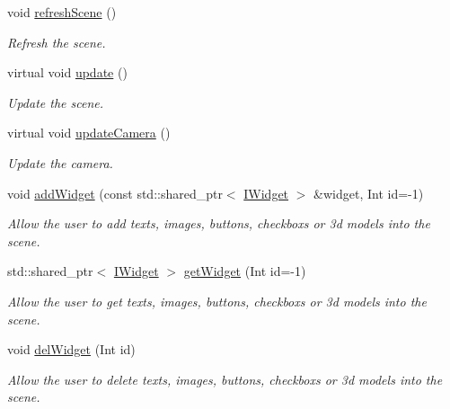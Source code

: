 \begin{DoxyCompactItemize}
\mbox{\label{classAScene_a94eb6d219e423c298a4c8339df47671c}} 
void \hyperlink{classAScene_a94eb6d219e423c298a4c8339df47671c}{refresh\+Scene} ()
\begin{DoxyCompactList}\small\item\em Refresh the scene. \end{DoxyCompactList}\item 
\mbox{\label{classAScene_a5f13212b503601ef58b8387b36c5796c}} 
virtual void \hyperlink{classAScene_a5f13212b503601ef58b8387b36c5796c}{update} ()
\begin{DoxyCompactList}\small\item\em Update the scene. \end{DoxyCompactList}\item 
\mbox{\label{classAScene_a3d7821a7bff4304027e22b27bebf4088}} 
virtual void \hyperlink{classAScene_a3d7821a7bff4304027e22b27bebf4088}{update\+Camera} ()
\begin{DoxyCompactList}\small\item\em Update the camera. \end{DoxyCompactList}\item 
void \hyperlink{classAScene_aa711b6068dd8dee262160eedfd96ad02}{add\+Widget} (const std\+::shared\+\_\+ptr$<$ \hyperlink{classIWidget}{I\+Widget} $>$ \&widget, Int id=-\/1)
\begin{DoxyCompactList}\small\item\em Allow the user to add texts, images, buttons, checkboxs or 3d models into the scene. \end{DoxyCompactList}\item 
std\+::shared\+\_\+ptr$<$ \hyperlink{classIWidget}{I\+Widget} $>$ \hyperlink{classAScene_a04796ae4f8cfdf49f7e3295c29fc97cc}{get\+Widget} (Int id=-\/1)
\begin{DoxyCompactList}\small\item\em Allow the user to get texts, images, buttons, checkboxs or 3d models into the scene. \end{DoxyCompactList}\item 
void \hyperlink{classAScene_ad2b0ac8cd74a8523c76b681a34b5f5b4}{del\+Widget} (Int id)
\begin{DoxyCompactList}\small\item\em Allow the user to delete texts, images, buttons, checkboxs or 3d models into the scene. \end{DoxyCompactList}\item 

\end{DoxyCompactItemize}
